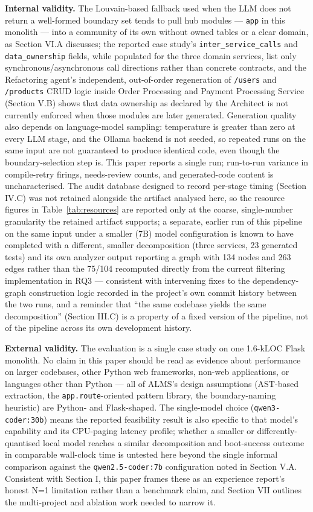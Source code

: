\documentclass[conference]{IEEEtran}
\begin{document}
\textbf{Internal validity.} The Louvain-based fallback used when the LLM does not return a well-formed boundary set tends to pull hub modules --- \texttt{app} in this monolith --- into a community of its own without owned tables or a clear domain, as Section VI.A discusses; the reported case study's \texttt{inter\_service\_calls} and \texttt{data\_ownership} fields, while populated for the three domain services, list only synchronous/asynchronous call directions rather than concrete contracts, and the Refactoring agent's independent, out-of-order regeneration of \texttt{/users} and \texttt{/products} CRUD logic inside Order Processing and Payment Processing Service (Section V.B) shows that data ownership as declared by the Architect is not currently enforced when those modules are later generated. Generation quality also depends on language-model sampling: temperature is greater than zero at every LLM stage, and the Ollama backend is not seeded, so repeated runs on the same input are not guaranteed to produce identical code, even though the boundary-selection step is. This paper reports a single run; run-to-run variance in compile-retry firings, needs-review counts, and generated-code content is uncharacterised. The audit database designed to record per-stage timing (Section IV.C) was not retained alongside the artifact analysed here, so the resource figures in Table~\ref{tab:resources} are reported only at the coarse, single-number granularity the retained artifact supports; a separate, earlier run of this pipeline on the same input under a smaller (7B) model configuration is known to have completed with a different, smaller decomposition (three services, 23 generated tests) and its own analyzer output reporting a graph with 134 nodes and 263 edges rather than the 75/104 recomputed directly from the current filtering implementation in RQ3 --- consistent with intervening fixes to the dependency-graph construction logic recorded in the project's own commit history between the two runs, and a reminder that ``the same codebase yields the same decomposition'' (Section III.C) is a property of a fixed version of the pipeline, not of the pipeline across its own development history.

\textbf{External validity.} The evaluation is a single case study on one 1.6-kLOC Flask monolith. No claim in this paper should be read as evidence about performance on larger codebases, other Python web frameworks, non-web applications, or languages other than Python --- all of ALMS's design assumptions (AST-based extraction, the \texttt{app.route}-oriented pattern library, the boundary-naming heuristic) are Python- and Flask-shaped. The single-model choice (\texttt{qwen3-coder:30b}) means the reported feasibility result is also specific to that model's capability and its CPU-paging latency profile; whether a smaller or differently-quantised local model reaches a similar decomposition and boot-success outcome in comparable wall-clock time is untested here beyond the single informal comparison against the \texttt{qwen2.5-coder:7b} configuration noted in Section V.A. Consistent with Section I, this paper frames these as an experience report's honest N=1 limitation rather than a benchmark claim, and Section VII outlines the multi-project and ablation work needed to narrow it.
\end{document}
